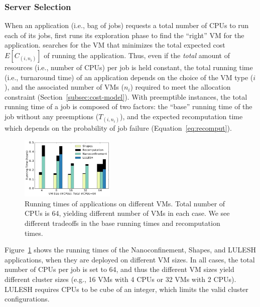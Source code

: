 \subsubsection{Server Selection}
\label{subsec:eval-serversel}

When an application (i.e., bag of jobs) requests a total number of CPUs to run each of its jobs, \sysname first runs its exploration phase to find the ``right'' VM for the application.
\sysname searches for the VM that minimizes the total expected cost $E[C_{(i,n_i)}]$ of running the application. %
Thus, even if the \emph{total} amount of resources (i.e., number of CPUs) per job is held constant, the total running time (i.e., turnaround time) of an application depends on the choice of the VM type ($i$), and the associated number of VMs ($n_i$) required to meet the allocation constraint (Section~\ref{subsec:cost-model}).
%
With preemptible instances, the total running time of a job is composed of two factors: the ``base'' running time of the job without any preemptions ($T_{(i,n_i)}$), and the expected recomputation time which depends on the probability of job failure (Equation~\ref{eq:recomput}). 

\begin{figure}
  \centering
  \includegraphics[width=0.4\textwidth]{../graphs/runtime-bars.pdf}
      \vspace*{\myfigspace}
  \caption{Running times of applications on different VMs. Total number of CPUs is 64, yielding different number of VMs in each case. We see different tradeoffs in the base running times and recomputation times.}
  \label{fig:runtimes-bar}
    \vspace*{\myfigspace}
\end{figure}


Figure~\ref{fig:runtimes-bar} shows the running times of the Nanoconfinement, Shapes, and LULESH applications, when they are deployed on different VM sizes. 
In all cases, the total number of CPUs per job is set to 64, and thus the different VM sizes yield different cluster sizes (e.g., 16 VMs with 4 CPUs or 32 VMs with 2 CPUs).
LULESH requires CPUs to be cube of an integer, which limits the valid cluster configurations. 


